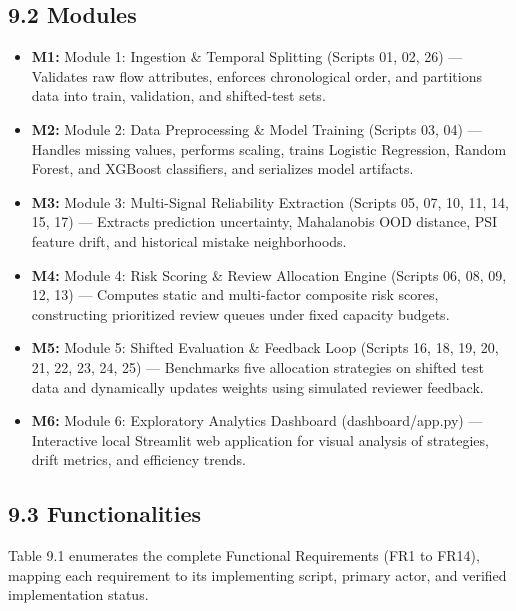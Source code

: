 \subsection{9.2 Modules}

\begin{itemize}
\item \textbf{M1:} Module 1: Ingestion \& Temporal Splitting (Scripts 01, 02, 26) --- Validates raw flow attributes, enforces chronological order, and partitions data into train, validation, and shifted-test sets.
\item \textbf{M2:} Module 2: Data Preprocessing \& Model Training (Scripts 03, 04) --- Handles missing values, performs scaling, trains Logistic Regression, Random Forest, and XGBoost classifiers, and serializes model artifacts.
\item \textbf{M3:} Module 3: Multi-Signal Reliability Extraction (Scripts 05, 07, 10, 11, 14, 15, 17) --- Extracts prediction uncertainty, Mahalanobis OOD distance, PSI feature drift, and historical mistake neighborhoods.
\item \textbf{M4:} Module 4: Risk Scoring \& Review Allocation Engine (Scripts 06, 08, 09, 12, 13) --- Computes static and multi-factor composite risk scores, constructing prioritized review queues under fixed capacity budgets.
\item \textbf{M5:} Module 5: Shifted Evaluation \& Feedback Loop (Scripts 16, 18, 19, 20, 21, 22, 23, 24, 25) --- Benchmarks five allocation strategies on shifted test data and dynamically updates weights using simulated reviewer feedback.
\item \textbf{M6:} Module 6: Exploratory Analytics Dashboard (dashboard/app.py) --- Interactive local Streamlit web application for visual analysis of strategies, drift metrics, and efficiency trends.
\end{itemize}

\subsection{9.3 Functionalities}

Table 9.1 enumerates the complete Functional Requirements (FR1 to FR14), mapping each requirement to its implementing script, primary actor, and verified implementation status.

